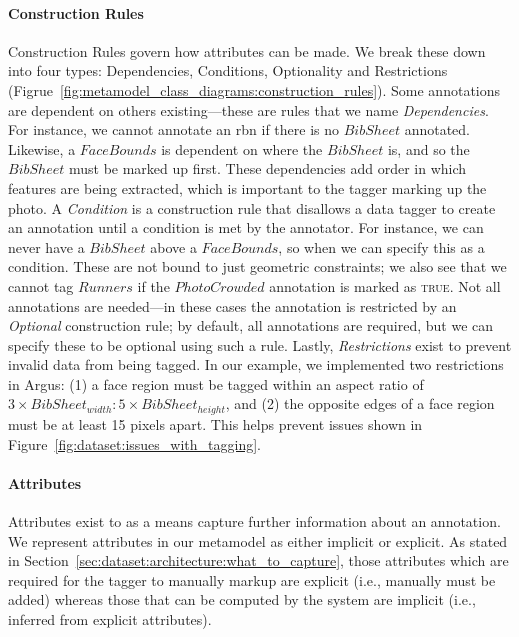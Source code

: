 \paragraph{Construction Rules} 

Construction Rules govern how attributes can be made. We break these down into four types: Dependencies, Conditions, Optionality and Restrictions (Figrue~\ref{fig:metamodel_class_diagrams:construction_rules}). Some annotations are dependent on others existing---these are rules that we name \textit{Dependencies}. For instance, we cannot annotate an \gls{rbn} if there is no $BibSheet$ annotated. Likewise, a $FaceBounds$ is dependent on where the $BibSheet$ is, and so the $BibSheet$ must be marked up first. These dependencies add order in which features are being extracted, which is important to the tagger marking up the photo. A \textit{Condition} is a construction rule that disallows a data tagger to create an annotation until a condition is met by the annotator. For instance, we can never have a $BibSheet$ above a $FaceBounds$, so when we can specify this as a condition. These are not bound to just geometric constraints; we also see that we cannot tag $Runners$ if the $PhotoCrowded$ annotation is marked as \textsc{true}. Not all annotations are needed---in these cases the annotation is restricted by an \textit{Optional} construction rule; by default, all annotations are required, but we can specify these to be optional using such a rule. Lastly, \textit{Restrictions} exist to prevent invalid data from being tagged. In our example, we implemented two restrictions in Argus: (1) a face region must be tagged within an aspect ratio of $3 \times BibSheet_{width} : 5 \times BibSheet_{height}$, and (2) the opposite edges of a face region must be at least 15 pixels apart. This helps prevent issues shown in Figure~\ref{fig:dataset:issues_with_tagging}.


\paragraph{Attributes}

Attributes exist to as a means capture further information about an annotation. We represent attributes in our metamodel as either implicit or explicit. As stated in Section~\ref{sec:dataset:architecture:what_to_capture}, those attributes which are required for the tagger to manually markup are explicit (i.e., manually must be added) whereas those that can be computed by the system are implicit (i.e., inferred from explicit attributes).